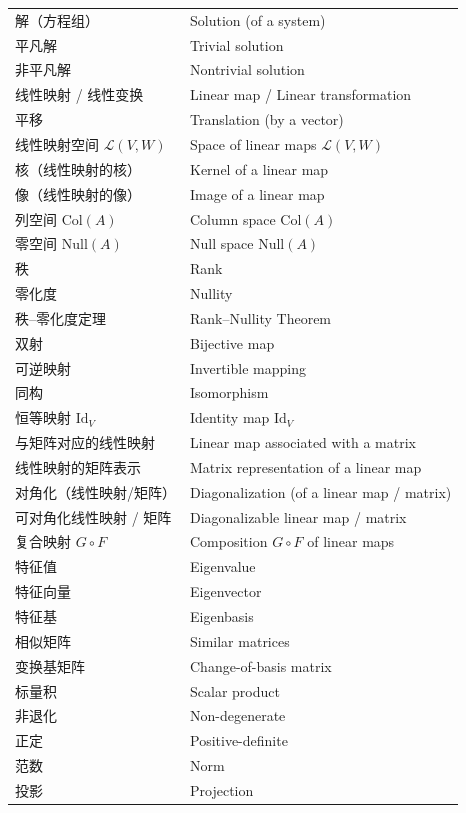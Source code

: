 \documentclass{ctexart}
\begin{document}
\begin{center}
\begin{longtable}{|>{\raggedright\arraybackslash}p{5cm}|>{\raggedright\arraybackslash}p{8cm}|}
			解（方程组） & Solution (of a system) \\
			平凡解 & Trivial solution \\
			非平凡解 & Nontrivial solution \\
			线性映射 / 线性变换 & Linear map / Linear transformation \\
			平移 & Translation (by a vector) \\
			线性映射空间 $\mathcal{L}(V,W)$ & Space of linear maps $\mathcal{L}(V,W)$ \\
			核（线性映射的核） & Kernel of a linear map \\
			像（线性映射的像） & Image of a linear map \\
			列空间 $\mathrm{Col}(A)$ & Column space $\mathrm{Col}(A)$ \\
			零空间 $\mathrm{Null}(A)$ & Null space $\mathrm{Null}(A)$ \\
			秩 & Rank \\
			零化度 & Nullity \\
			秩–零化度定理 & Rank–Nullity Theorem \\
			双射 & Bijective map \\
			可逆映射 & Invertible mapping \\
			同构 & Isomorphism \\
			恒等映射 $\mathrm{Id}_V$ & Identity map $\mathrm{Id}_V$ \\
			与矩阵对应的线性映射 & Linear map associated with a matrix \\
			线性映射的矩阵表示 & Matrix representation of a linear map \\
			对角化（线性映射/矩阵） & Diagonalization (of a linear map / matrix) \\
			可对角化线性映射 / 矩阵 & Diagonalizable linear map / matrix \\
			复合映射 $G\circ F$ & Composition $G\circ F$ of linear maps \\
			特征值 & Eigenvalue \\
			特征向量 & Eigenvector \\
			特征基 & Eigenbasis \\
			相似矩阵 & Similar matrices \\
			变换基矩阵 & Change-of-basis matrix \\
			标量积 & Scalar product \\
			非退化 & Non-degenerate \\
			正定 & Positive-definite \\
			范数 & Norm \\
			投影 & Projection \\

\end{longtable}
\end{center}
\end{document}
